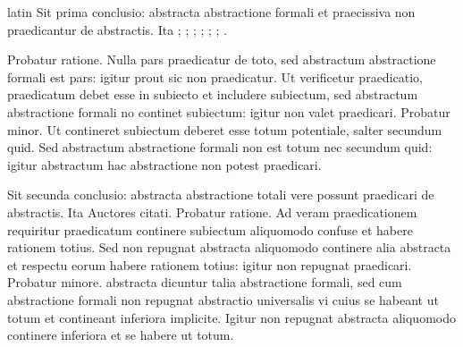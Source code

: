 \begin{otherlanguage*}{latin}
\pstart
Sit prima conclusio:
abstracta abstractione formali et praecissiva non praedicantur de abstractis. Ita ; ; ; ; ; ; . 
\pend

\pstart
Probatur ratione. Nulla pars praedicatur de toto, sed abstractum abstractione formali est pars:
igitur prout sic non praedicatur. Ut verificetur praedicatio, praedicatum debet esse in subiecto et includere subiectum, sed abstractum abstractione formali no continet subiectum:
igitur non valet praedicari. Probatur minor. Ut contineret subiectum deberet esse totum potentiale, salter secundum quid. Sed abstractum abstractione formali non est totum nec secundum quid:
igitur abstractum hac abstractione non potest praedicari. 
\pend

\pstart
Sit secunda conclusio:
abstracta abstractione totali vere possunt praedicari de abstractis. Ita Auctores citati. Probatur ratione. Ad veram praedicationem requiritur praedicatum continere subiectum aliquomodo confuse et habere rationem totius. Sed non repugnat abstracta aliquomodo continere alia abstracta et respectu eorum habere rationem totius:
igitur non repugnat praedicari. Probatur minore.  abstracta dicuntur talia abstractione formali, sed cum abstractione formali non repugnat abstractio  universalis vi cuius se habeant ut totum et contineant inferiora implicite. Igitur non repugnat abstracta aliquomodo continere inferiora et se habere ut totum. 
\pend


\end{otherlanguage*}

